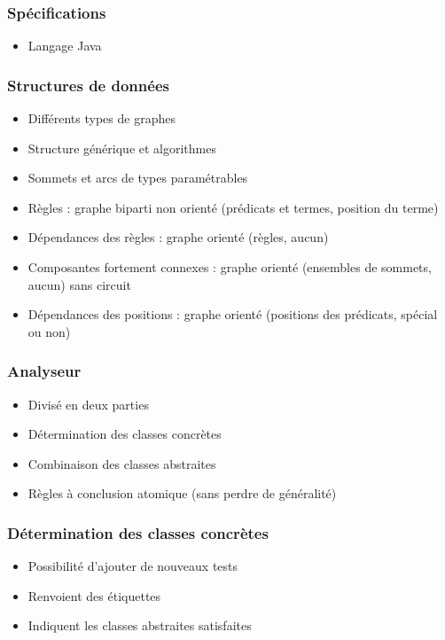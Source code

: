 
\begin{frame}
	\frametitle{Spécifications}
	\begin{itemize}
		\item Langage Java
	\end{itemize}
\end{frame}

\begin{frame}
	\frametitle{Structures de données}
	\begin{itemize}
		\item Différents types de graphes
		\item Structure générique et algorithmes
		\item Sommets et arcs de types paramétrables
		\item Règles : graphe biparti non orienté (prédicats et termes, position du terme)
		\item Dépendances des règles : graphe orienté (règles, aucun)
		\item Composantes fortement connexes : graphe orienté (ensembles de sommets,
		aucun) sans circuit
		\item Dépendances des positions : graphe orienté (positions des prédicats,
		spécial ou non)
	\end{itemize}
\end{frame}

\begin{frame}
	\frametitle{Analyseur}
	\begin{itemize}
		\item Divisé en deux parties
		\item Détermination des classes concrètes
		\item Combinaison des classes abstraites
		\item Règles à conclusion atomique (sans perdre de généralité)
	\end{itemize}
\end{frame}

\begin{frame}
	\frametitle{Détermination des classes concrètes}
	\begin{itemize}
		\item Possibilité d'ajouter de nouveaux tests
		\item Renvoient des étiquettes
		\item Indiquent les classes abstraites satisfaites
	\end{itemize}
\end{frame}

